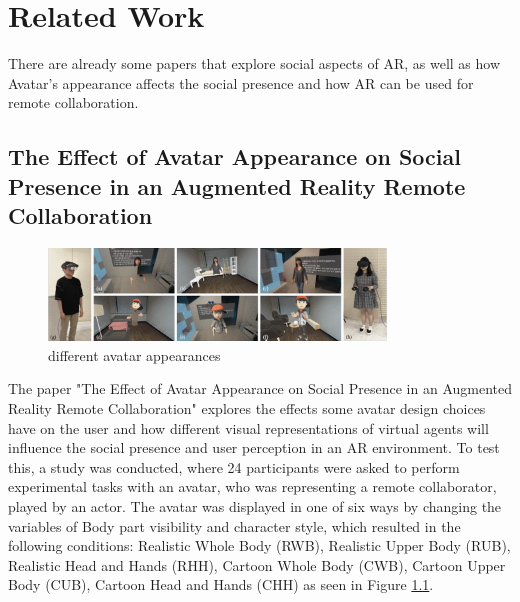 \chapter{Related Work}
\label{sec::relatedwork}

There are already some papers that explore social aspects of AR, as well as how Avatar's appearance affects the social presence and how AR can be used for remote collaboration.

\section{The Effect of Avatar Appearance on Social Presence in an Augmented Reality Remote Collaboration}
\label{effectOfAvatarAppearance}

\begin{figure}[H]
\centering
\includegraphics[width = 0.8\textwidth]{figures/Bildschirmfoto 2022-06-10 um 18.07.25}
\caption[Study 1 setup]{different avatar appearances}
\label{fig::avatarAppearences}
\end{figure}


The paper "The Effect of Avatar Appearance on Social Presence in an Augmented Reality Remote Collaboration" \cite{8797719}explores the effects some avatar design choices have on the user and how different visual representations of virtual agents will influence the social presence and user perception in an AR environment. To test this, a study was conducted, where 24 participants were asked to perform experimental tasks with an avatar, who was representing a remote collaborator, played by an actor. The avatar was displayed in one of six ways by changing the variables of Body part visibility and character style, which resulted in the following conditions: Realistic Whole Body (RWB), Realistic Upper Body (RUB), Realistic Head and Hands (RHH), Cartoon Whole Body (CWB), Cartoon Upper Body (CUB), Cartoon Head and Hands (CHH) as seen in Figure \ref{fig::avatarAppearences}.


